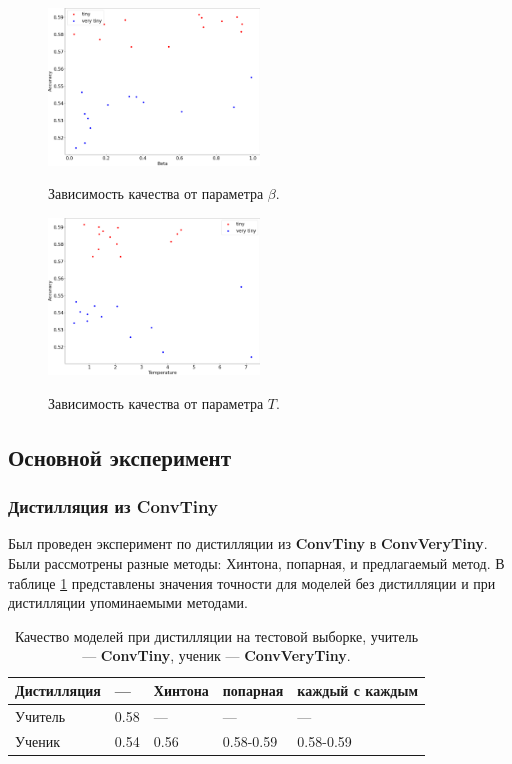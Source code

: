 \documentclass[14]{article}
\begin{document}
\begin{figure}[h]
  \begin{multicols}{2}
    \hfill
    \includegraphics[width=0.5\textwidth]{../figures/scatter_hinton_beta_acc.png}
    \hfill
    \caption{Зависимость качества от параметра $\beta$.}
    \label{ris:hinton_beta}
    \hfill
    \includegraphics[width=0.5\textwidth]{../figures/scatter_hinton_temp_acc.png}
    \hfill
    \caption{Зависимость качества от параметра $T$.}
    \label{ris:hinton_temp}
  \end{multicols}
\end{figure}

\subsection{Основной эксперимент}

\subsubsection{Дистилляция из \textbf{ConvTiny}}

Был проведен эксперимент по дистилляции из \textbf{ConvTiny} в \textbf{ConvVeryTiny}.
Были рассмотрены разные методы: Хинтона, попарная, и предлагаемый метод.
В таблице \ref{table:tiny} представлены значения точности для моделей без дистилляции и при дистилляции упоминаемыми методами.


\begin{table}[h!]
  \centering
  \begin{tabular}{|l|l|l|l|l|}
    \hline
    Дистилляция & ---  & Хинтона & попарная  & каждый с каждым \\ \hline
    Учитель     & 0.58 & ---     & ---       & ---             \\ \hline
    Ученик      & 0.54 & 0.56    & 0.58-0.59 & 0.58-0.59       \\ \hline
  \end{tabular}
  \caption{Качество моделей при дистилляции на тестовой выборке, учитель --- \textbf{ConvTiny}, ученик --- \textbf{ConvVeryTiny}.}
  \label{table:tiny}
\end{table}
\end{document}
